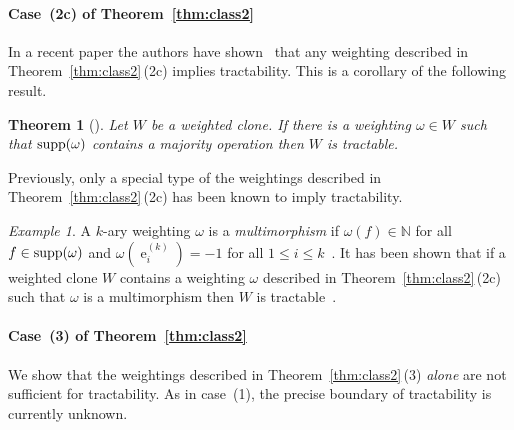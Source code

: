 \documentclass[11pt, reqno]{article}
\DeclareMathOperator{\proj}{\ensuremath{e}}
\DeclareMathOperator{\supp}{{\rm supp}}
\newtheorem{theorem}{Theorem}%
\theoremstyle{remark}
\newtheorem{example}{Example}
\begin{document}
\paragraph{Case~(2c) of Theorem~\ref{thm:class2}}

In a recent paper the authors have shown~\cite{tz15:icalp} that any weighting
described in Theorem~\ref{thm:class2}\,(2c) implies tractability. This is a
corollary of the following result.

\begin{theorem}[\hspace*{-0.3em}\cite{tz15:icalp}]
Let $W$ be a weighted clone. If there is a weighting $\omega\in W$ such that
$\supp(\omega)$ contains a majority operation then $W$ is tractable.
\end{theorem}

Previously, only a special type of the weightings described in
Theorem~\ref{thm:class2}\,(2c) has been known to imply tractability.

\begin{example}
A $k$-ary weighting $\omega$ is a \emph{multimorphism} if
$\omega(f)\in\mathbb{N}$ for all $f\in\supp(\omega)$ and
$\omega(\proj^{(k)}_i)=-1$ for all $1\leq i\leq
k$~\cite{Cohen06:complexitysoft}. It has been shown that if a weighted clone
$W$ contains a weighting $\omega$ described in Theorem~\ref{thm:class2}\,(2c)
such that $\omega$ is a multimorphism then $W$ is tractable~\cite{kz13:jacm}.
\end{example}


\paragraph{Case~(3) of Theorem~\ref{thm:class2}}

We show that the weightings described in Theorem~\ref{thm:class2}\,(3)
\emph{alone} are not
sufficient for tractability. As in case~(1),
the precise boundary of tractability is currently unknown.
\end{document}
